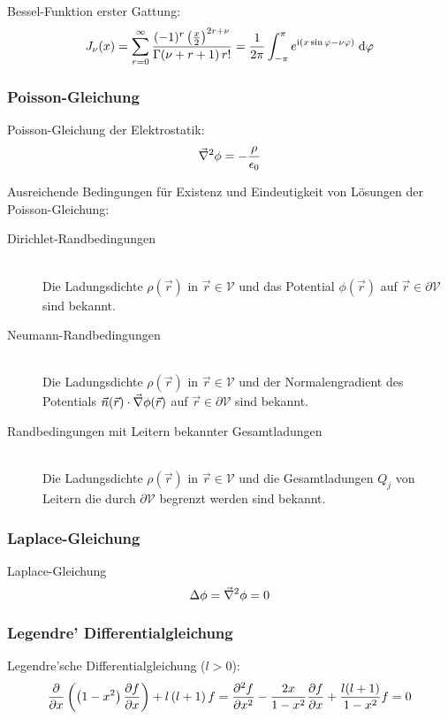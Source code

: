 \documentclass[11pt]{article}
\numberwithin{equation}{section}
\begin{document}
				\noindent
				Bessel-Funktion erster Gattung:
				\begin{equation}
					J_\nu(x) = \sum_{r=0}^\infty \frac{(-1)^r\left(\frac{x}{2}\right)^{2r+\nu}}{\Gamma(\nu+r+1)\,r!} = \frac{1}{2\pi}\int_{-\pi}^{\pi} 	e^{\mathrm{i}(x\sin\varphi-\nu\varphi)}\;\mathrm{d}\varphi
				\end{equation}

			\subsubsection{Poisson-Gleichung}
				\noindent
				Poisson-Gleichung der Elektrostatik:
				\begin{equation}
					\vec{\nabla}^2\phi = -\frac{\rho}{\epsilon_0}
				\end{equation}

				\noindent
				Ausreichende Bedingungen für Existenz und Eindeutigkeit von Lösungen der Poisson-Gleichung:
				\begin{description}
					\item[Dirichlet-Randbedingungen]\hfill \\
						Die Ladungsdichte $\rho(\vec{r})$ in $\vec{r}\in\mathcal{V}$ und das Potential $\phi(\vec{r})$ auf $\vec{r}\in\partial\mathcal{V}$ sind bekannt.
					\item[Neumann-Randbedingungen]\hfill \\
						Die Ladungsdichte $\rho(\vec{r})$ in $\vec{r}\in\mathcal{V}$ und der Normalengradient des Potentials $\vec{n}(\vec{r})\cdot\vec{\nabla}\phi(\vec{r})$ auf $\vec{r}\in\partial\mathcal{V}$ sind bekannt.
					\item[Randbedingungen mit Leitern bekannter Gesamtladungen]\hfill \\
						Die Ladungsdichte $\rho(\vec{r})$ in $\vec{r}\in\mathcal{V}$ und die Gesamtladungen $Q_j$ von Leitern die durch $\partial\mathcal{V}$ begrenzt werden sind bekannt.
				\end{description}

			\subsubsection{Laplace-Gleichung}
				\noindent
				Laplace-Gleichung
				\begin{equation}
					\Delta\phi=\vec{\nabla}^2\phi = 0
				\end{equation}

			\subsubsection{Legendre' Differentialgleichung}
				\noindent
				Legendre'sche Differentialgleichung ($l>0$):
				\begin{equation}
					\frac{\partial }{\partial x}\left(\left(1-x^2\right)\frac{\partial f}{\partial x}\right)+l\left(l+1\right)f
					= \frac{\partial^2 f}{\partial x^2} - \frac{2x}{1-x^2}\frac{\partial f}{\partial x} + \frac{l(l+1)}{1-x^2}f = 0
				\end{equation}
\end{document}
